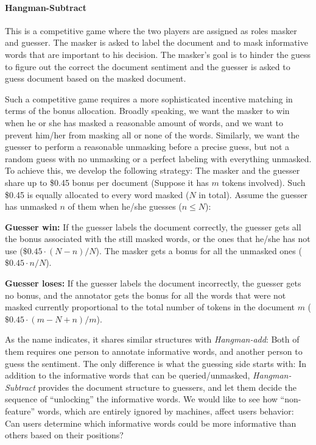 \documentclass[chi_draft]{sigchi}
\begin{document}
\paragraph{Hangman-Subtract} 
This is a competitive game where the two players are assigned as roles masker and guesser. The masker is asked to label the document and to mask informative words that are important to his decision. The masker's goal is to hinder the guess to figure out the correct the document sentiment and the guesser is asked to guess document based on the masked document. 

Such a competitive game requires a more sophisticated incentive matching in terms of the bonus allocation. Broadly speaking, we want the masker to win when he or she has masked a reasonable amount of words, and we want to prevent him/her from masking all or none of the words. 
Similarly, we want the guesser to perform a reasonable unmasking before a precise guess, but not a random guess with no unmasking or a perfect labeling with everything unmasked.
To achieve this, we develop the following strategy: 
The masker and the guesser share up to \$0.45 bonus per document (Suppose it has $m$ tokens involved).
Such \$0.45 is equally allocated to every word masked ($N$ in total).
Assume the guesser has unmasked $n$ of them when he/she guesses ($n \leq N$):

\begin{compactitem}
	\item \textbf{Guesser win: } If the guesser labels the document correctly, the guesser gets all the bonus associated with the still masked words, or the ones that he/she has not use ($\$0.45\cdot (N-n) / N$). The masker gets a bonus for all the unmasked ones ($\$0.45\cdot n / N$). 
	\item \textbf{Guesser loses: } If the guesser labels the document incorrectly, the guesser gets no bonus, and the annotator gets the bonus for all the words that were not masked currently proportional to the total number of tokens in the document $m$ ($\$0.45\cdot (m-N+n) / m$).
\end{compactitem}

As the name indicates, it shares similar structures with \emph{Hangman-add}: 
Both of them requires one person to annotate informative words, and another person to  guess the sentiment. 
The only difference is what the guessing side starts with: 
In addition to the informative words that can be queried/unmasked, \emph{Hangman-Subtract} provides the document structure to guessers, and let them decide the sequence of ``unlocking'' the informative words. 
We would like to see how ``non-feature'' words, which are entirely ignored by machines, affect users behavior: Can users determine which informative words could be more informative than others based on their positions?
\end{document}
